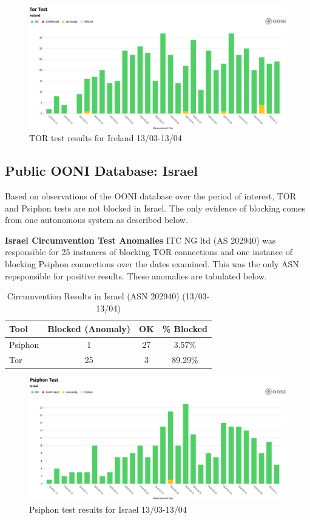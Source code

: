 \begin{figure} [H]
    \centering
    \includegraphics[width=0.5\linewidth]{IREDBTOR.png}
    \caption{TOR test results for Ireland 13/03-13/04}
    \label{fig:enter-label}
\end{figure}

\subsection{Public OONI Database: Israel}

Based on observations of the OONI database over the period of interest, TOR and Psiphon tests are not blocked in Israel. The only evidence of blocking comes from one autonomous system as described below.

\textbf{Israel Circumvention Test Anomalies}
ITC NG ltd (AS 202940) was responsible for 25 instances of blocking TOR connections and one instance of blocking Psiphon connections over the dates examined. This was the only ASN repsponsible for positive results. These anomalies are tabulated below.

\begin{table}[H]
\centering
\caption{Circumvention Results in Israel (ASN 202940)  (13/03-13/04)}
\begin{tabular}{lccc}
\toprule
\textbf{Tool} & \textbf{Blocked (Anomaly)} & \textbf{OK} & \textbf{\% Blocked} \\
\midrule
Psiphon & 1  & 27 & 3.57\% \\
Tor     & 25 & 3  & 89.29\% \\
\bottomrule
\end{tabular}
\label{tab:circumvention_israel}
\end{table}


\begin{figure} [H]
    \centering
    \includegraphics[width=0.5\linewidth]{ISROONIPSI.png}
    \caption{Psiphon test results for Israel 13/03-13/04}
    \label{fig:enter-label}
\end{figure}

